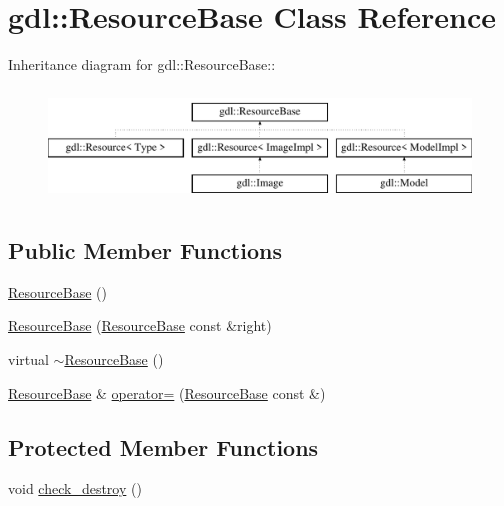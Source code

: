 \hypertarget{classgdl_1_1ResourceBase}{
\section{gdl::ResourceBase Class Reference}
\label{classgdl_1_1ResourceBase}
}
Inheritance diagram for gdl::ResourceBase::\begin{figure}[H]
\begin{center}
\leavevmode
\includegraphics[height=3cm]{classgdl_1_1ResourceBase}
\end{center}
\end{figure}
\subsection*{Public Member Functions}
\begin{DoxyCompactItemize}
\item 
\hyperlink{classgdl_1_1ResourceBase_a0289636bcf3853381deb2325703d6d3d}{ResourceBase} ()
\item 
\hyperlink{classgdl_1_1ResourceBase_a8fc7453fe6219c010c42d31df1940e7e}{ResourceBase} (\hyperlink{classgdl_1_1ResourceBase}{ResourceBase} const \&right)
\item 
virtual \hyperlink{classgdl_1_1ResourceBase_afc2de70f0ca229deef3e5a5af1399736}{$\sim$ResourceBase} ()
\item 
\hyperlink{classgdl_1_1ResourceBase}{ResourceBase} \& \hyperlink{classgdl_1_1ResourceBase_a6655b5024b90d376ba4ed4f807d03f90}{operator=} (\hyperlink{classgdl_1_1ResourceBase}{ResourceBase} const \&)
\end{DoxyCompactItemize}
\subsection*{Protected Member Functions}
\begin{DoxyCompactItemize}
\item 
void \hyperlink{classgdl_1_1ResourceBase_add4498c5016ed85778964adc7b932412}{check\_\-destroy} ()
\end{DoxyCompactItemize}


